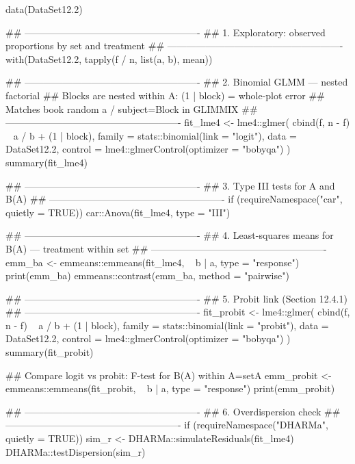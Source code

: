 \documentclass[a4paper]{book}
\begin{document}
\begin{Examples}
\begin{ExampleCode}
data(DataSet12.2)

## -------------------------------------------------------
## 1. Exploratory: observed proportions by set and treatment
## -------------------------------------------------------
with(DataSet12.2, tapply(f / n, list(a, b), mean))

## -------------------------------------------------------
## 2. Binomial GLMM — nested factorial
## Blocks are nested within A: (1 | block) = whole-plot error
## Matches book random a / subject=Block in GLIMMIX
## -------------------------------------------------------
fit_lme4 <- lme4::glmer(
  cbind(f, n - f) ~ a / b + (1 | block),
  family  = stats::binomial(link = "logit"),
  data    = DataSet12.2,
  control = lme4::glmerControl(optimizer = "bobyqa")
)
summary(fit_lme4)

## -------------------------------------------------------
## 3. Type III tests for A and B(A)
## -------------------------------------------------------
if (requireNamespace("car", quietly = TRUE)) {
  car::Anova(fit_lme4, type = "III")
}

## -------------------------------------------------------
## 4. Least-squares means for B(A) — treatment within set
## -------------------------------------------------------
emm_ba <- emmeans::emmeans(fit_lme4, ~ b | a, type = "response")
print(emm_ba)
emmeans::contrast(emm_ba, method = "pairwise")

## -------------------------------------------------------
## 5. Probit link (Section 12.4.1)
## -------------------------------------------------------
fit_probit <- lme4::glmer(
  cbind(f, n - f) ~ a / b + (1 | block),
  family  = stats::binomial(link = "probit"),
  data    = DataSet12.2,
  control = lme4::glmerControl(optimizer = "bobyqa")
)
summary(fit_probit)

## Compare logit vs probit: F-test for B(A) within A=setA
emm_probit <- emmeans::emmeans(fit_probit, ~ b | a, type = "response")
print(emm_probit)

## -------------------------------------------------------
## 6. Overdispersion check
## -------------------------------------------------------
if (requireNamespace("DHARMa", quietly = TRUE)) {
  sim_r <- DHARMa::simulateResiduals(fit_lme4)
  DHARMa::testDispersion(sim_r)
}
\end{ExampleCode}
\end{Examples}
\end{document}
